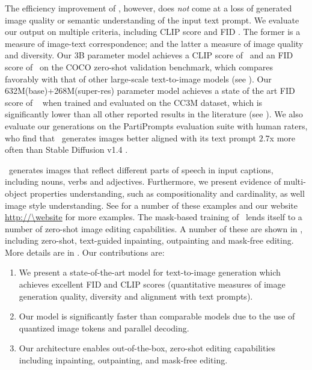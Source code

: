 The efficiency improvement of \name, however, does \emph{not} come at a loss of generated image quality or semantic understanding of the input text prompt. We evaluate our output on multiple criteria, including CLIP score \citep{clip} and FID \citep{fid}. The former is a measure of image-text correspondence; and the latter a measure of image quality and diversity. Our 3B parameter model achieves a CLIP score of \cococlip~and an FID score of \cocofid~on the COCO \citep{coco} zero-shot validation benchmark, which compares favorably with that of other large-scale text-to-image models (see ). %
Our 632M(base)+268M(super-res) parameter model achieves a state of the art FID score of \ccfidsr~ when trained and evaluated on the CC3M \citep{sharma2018conceptual} dataset, which is significantly lower than all other reported results in the literature (see ). We also evaluate our generations on the PartiPrompts \citep{parti} evaluation suite with human raters, who find that \name~generates images better aligned with its text prompt $2.7$x more often than Stable Diffusion v1.4 \citep{ldm}. 

\name~generates images that reflect different parts of speech in input captions, including nouns, verbs and adjectives.
Furthermore, we present evidence of multi-object properties understanding, such as compositionality and cardinality, as well image style understanding.
See  for a number of these examples and our website \url{http://\website} for more examples. The mask-based training of \name~lends itself to a number of zero-shot image editing capabilities. A number of these are shown in , including zero-shot, text-guided inpainting, outpainting and mask-free editing. More details are in . Our contributions are: 
\begin{enumerate}[topsep=1pt, partopsep=1pt, itemsep=1pt,parsep=1pt]
    \item We present a state-of-the-art model for text-to-image generation which achieves excellent FID and CLIP scores (quantitative measures of image generation quality, diversity and alignment with text prompts).
    \item Our model is significantly faster than comparable models due to the use of quantized image tokens and parallel decoding.
    \item Our architecture enables out-of-the-box, zero-shot editing capabilities including inpainting, outpainting, and mask-free editing.
\end{enumerate}

